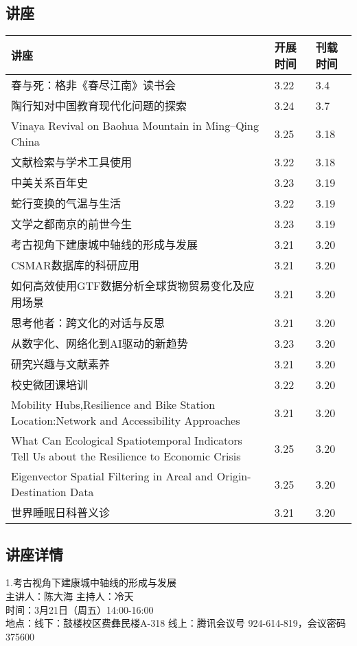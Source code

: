 \documentclass[letterpaper, 12pt]{article}
\begin{document}
\begin{multicols}{2}
\pagebreak

\section{讲座}
\begin{tabular}{|>{\centering\arraybackslash}m{}|m{}|m{}|}
    \hline
    讲座 & 开展时间 & 刊载时间\\
    \hline\hline
    春与死：格非《春尽江南》读书会 & 3.22 & 3.4\\\hline
    陶行知对中国教育现代化问题的探索 & 3.24 & 3.7\\\hline
    Vinaya Revival on Baohua Mountain in Ming–Qing China & 3.25 & 3.18 \\\hline
    文献检索与学术工具使用 & 3.22 & 3.18\\\hline
    中美关系百年史 & 3.23 & 3.19\\\hline
    蛇行变换的气温与生活 & 3.22 & 3.19\\\hline
    文学之都南京的前世今生 & 3.23 & 3.19\\\hline
    考古视角下建康城中轴线的形成与发展 & 3.21 & 3.20\\\hline
    CSMAR数据库的科研应用 & 3.21 & 3.20\\\hline
    如何高效使用GTF数据分析全球货物贸易变化及应用场景 & 3.21 & 3.20\\\hline
    思考他者：跨文化的对话与反思 & 3.21 & 3.20\\\hline
    从数字化、网络化到AI驱动的新趋势 & 3.23 & 3.20\\\hline
    研究兴趣与文献素养 & 3.21 & 3.20\\\hline
    校史微团课培训 & 3.22 & 3.20\\\hline
    Mobility Hubs,Resilience and Bike Station Location:Network and Accessibility Approaches & 3.21 & 3.20\\\hline
    What Can Ecological Spatiotemporal Indicators Tell Us about the Resilience to Economic Crisis & 3.25 & 3.20\\\hline
    Eigenvector Spatial Filtering in Areal and Origin-Destination Data & 3.25 & 3.20\\\hline
    世界睡眠日科普义诊 & 3.21 & 3.20\\\hline
\end{tabular}
\subsection{讲座详情}
1.考古视角下建康城中轴线的形成与发展\\
主讲人：陈大海 主持人：冷天\\
时间：3月21日（周五）14:00-16:00\\
地点：线下：鼓楼校区费彝民楼A-318 线上：腾讯会议号 924-614-819，会议密码 375600\\


\end{multicols}
\end{document}
